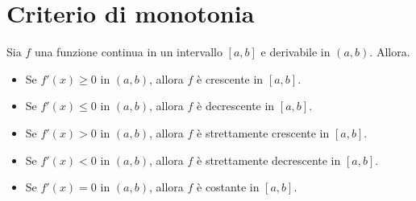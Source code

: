 \documentclass{article}
\begin{document}
\section*{Criterio di monotonia}
Sia $f$ una funzione continua in un intervallo $[a,b]$ e derivabile in $(a,b)$. Allora.
\begin{itemize}
    \item Se $f'(x)\geq 0$ in $(a,b)$, allora $f$ è crescente in $[a,b]$.
    \item Se $f'(x)\leq 0$ in $(a,b)$, allora $f$ è decrescente in $[a,b]$.
    \item Se $f'(x)> 0$ in $(a,b)$, allora $f$ è strettamente crescente in $[a,b]$.
    \item Se $f'(x)< 0$ in $(a,b)$, allora $f$ è strettamente decrescente in $[a,b]$.
    \item Se $f'(x)= 0$ in $(a,b)$, allora $f$ è costante in $[a,b]$.
\end{itemize}
\newpage
\end{document}
